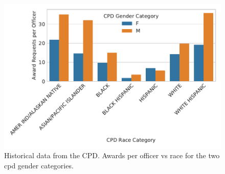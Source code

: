 \begin{figure}[h] 
\includegraphics[width=\textwidth]{figs/awards} 
\caption{Historical data from the CPD. Awards per officer vs race for the two cpd gender categories.} \label{fig:awards}
\end{figure}


